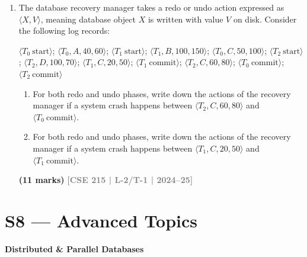 \documentclass[12pt,a3paper]{article}
\newcommand{\yr}[1]{\hfill\textcolor{gray}{\small\textbf{[#1]}}}
\newcommand{\mk}[1]{\textcolor{orange!70!black}{\small\textbf{(#1 marks)}}}
\newcommand{\subtopic}[2]{%
  \vspace{10pt}
  \noindent\begin{tcolorbox}[colback=#1!8,colframe=#1,boxrule=0.6pt,arc=4pt,
    left=6pt,right=6pt,top=4pt,bottom=4pt]
    \small\bfseries\textcolor{#1}{#2}
  \end{tcolorbox}
  \vspace{2pt}
}
\begin{document}
\begin{enumerate}
\item The database recovery manager takes a redo or undo action expressed as $\langle X, V\rangle$, meaning database object $X$ is written with value $V$ on disk. Consider the following log records:
\begin{center}
\small\ttfamily
$\langle T_0\ \text{start}\rangle$; $\langle T_0, A, 40, 60\rangle$; $\langle T_1\ \text{start}\rangle$; $\langle T_1, B, 100, 150\rangle$; $\langle T_0, C, 50, 100\rangle$; $\langle T_2\ \text{start}\rangle$; $\langle T_2, D, 100, 70\rangle$; $\langle T_1, C, 20, 50\rangle$; $\langle T_1\ \text{commit}\rangle$; $\langle T_2, C, 60, 80\rangle$; $\langle T_0\ \text{commit}\rangle$; $\langle T_2\ \text{commit}\rangle$
\end{center}
\begin{enumerate}
  \item For both redo and undo phases, write down the actions of the recovery manager if a system crash happens between $\langle T_2, C, 60, 80\rangle$ and $\langle T_0\ \text{commit}\rangle$.
  \item For both redo and undo phases, write down the actions of the recovery manager if a system crash happens between $\langle T_1, C, 20, 50\rangle$ and $\langle T_1\ \text{commit}\rangle$.
\end{enumerate}
\mk{11} \yr{CSE 215 | L-2/T-1 | 2024--25}

\end{enumerate}

\section{S8 --- Advanced Topics}
\label{sec:S8}

\subtopic{cE}{Distributed \& Parallel Databases}
\label{sub:s8-dist}
\end{document}
